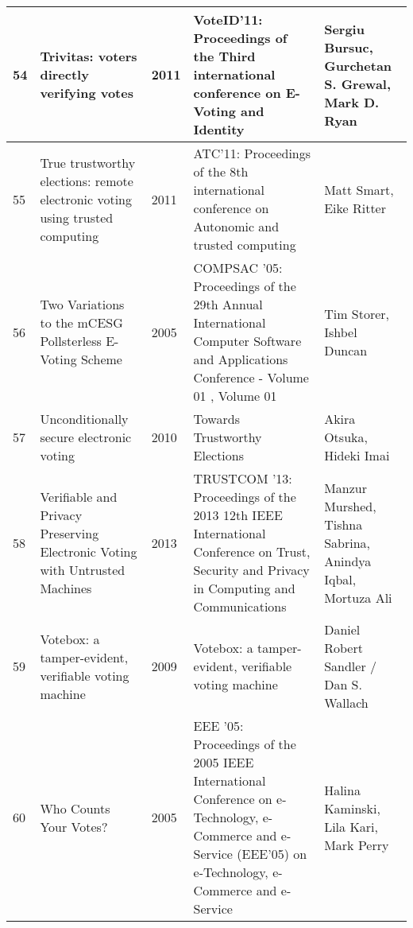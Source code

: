 \begin{landscape}
\begin{longtable}{p{0.5cm} p{5cm}  p{1.5cm} p{4.7cm} p{4.7cm} }
54 & Trivitas: voters directly verifying votes & 2011 & VoteID'11: Proceedings of the Third international conference on E-Voting and Identity & Sergiu Bursuc, Gurchetan S. Grewal, Mark D. Ryan \\ \hline
55 & True trustworthy elections: remote electronic voting using trusted computing & 2011 & ATC'11: Proceedings of the 8th international conference on Autonomic and trusted computing & Matt Smart, Eike Ritter \\ \hline
56 & Two Variations to the mCESG Pollsterless E-Voting Scheme & 2005 & COMPSAC '05: Proceedings of the 29th Annual International Computer Software and Applications Conference - Volume 01 , Volume 01 & Tim Storer, Ishbel Duncan \\ \hline
57 & Unconditionally secure electronic voting & 2010 & Towards Trustworthy Elections & Akira Otsuka, Hideki Imai \\ \hline
58 & Verifiable and Privacy Preserving Electronic Voting with Untrusted Machines & 2013 & TRUSTCOM '13: Proceedings of the 2013 12th IEEE International Conference on Trust, Security and Privacy in Computing and Communications & Manzur Murshed, Tishna Sabrina, Anindya Iqbal, Mortuza Ali \\ \hline
59 & Votebox: a tamper-evident, verifiable voting machine & 2009 & Votebox: a tamper-evident, verifiable voting machine & Daniel Robert Sandler / Dan S. Wallach \\ \hline
60 & Who Counts Your Votes? & 2005 & EEE '05: Proceedings of the 2005 IEEE International Conference on e-Technology, e-Commerce and e-Service (EEE'05) on e-Technology, e-Commerce and e-Service & Halina Kaminski, Lila Kari, Mark Perry \\ \hline

\end{longtable}
\end{landscape}

